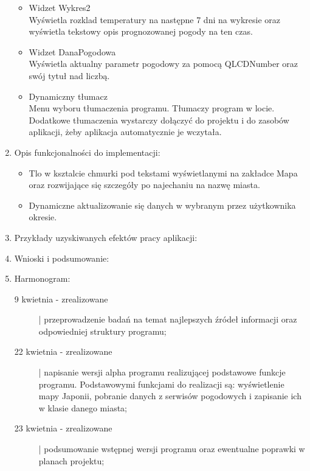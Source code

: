 \documentclass[a4paper]{article}
\begin{document}
\begin{enumerate}
\begin{itemize}
\item Widzet Wykres2\\
Wyświetla rozklad temperatury na następne 7 dni na wykresie oraz wyświetla tekstowy opis prognozowanej pogody na ten czas.

\item Widzet DanaPogodowa\\
Wyświetla aktualny parametr pogodowy za pomocą QLCDNumber oraz swój tytuł nad liczbą.

\item Dynamiczny tłumacz\\
Menu wyboru tłumaczenia programu. Tłumaczy program w locie. Dodatkowe tłumaczenia wystarczy dołączyć do projektu i do zasobów aplikacji, żeby aplikacja automatycznie je wczytała.

\end{itemize}

\pagebreak
\item Opis funkcjonalności do implementacji:
\begin{itemize}

\item Tlo w ksztalcie chmurki pod tekstami wyświetlanymi na zakładce Mapa oraz rozwijające się szczegóły po najechaniu na nazwę miasta.

\item Dynamiczne aktualizowanie się danych w wybranym przez użytkownika okresie.
\end{itemize}

\item Przykłady uzyskiwanych efektów pracy aplikacji:

\item Wnioski i podsumowanie:


\item Harmonogram:

\begin{description}
\item[9 kwietnia - zrealizowane] | przeprowadzenie badań na temat najlepszych źródeł informacji oraz odpowiedniej struktury programu;

\item[22 kwietnia - zrealizowane] | napisanie wersji alpha programu realizującej podstawowe funkcje programu. Podstawowymi funkcjami do realizacji są: wyświetlenie mapy Japonii, pobranie danych z serwisów pogodowych i zapisanie ich w klasie danego miasta;

\item[23 kwietnia - zrealizowane] | podsumowanie wstępnej wersji programu oraz ewentualne poprawki w planach projektu;


\end{description}
\end{enumerate}
\end{document}
